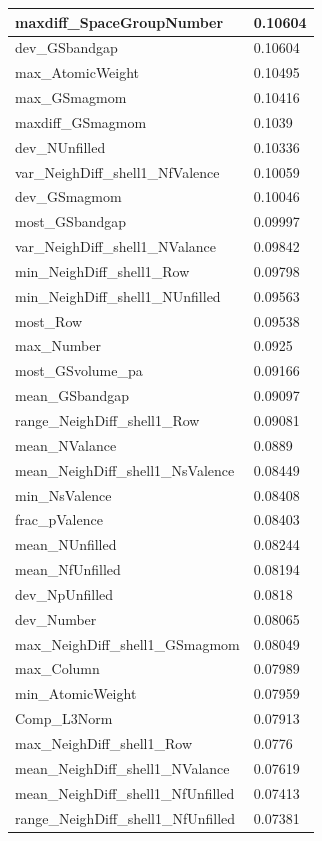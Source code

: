 \begin{longtable}{|l|l|}
maxdiff\_SpaceGroupNumber & 0.10604 \\ \hline
dev\_GSbandgap & 0.10604 \\ \hline
max\_AtomicWeight & 0.10495 \\ \hline
max\_GSmagmom & 0.10416 \\ \hline
maxdiff\_GSmagmom & 0.1039 \\ \hline
dev\_NUnfilled & 0.10336 \\ \hline
var\_NeighDiff\_shell1\_NfValence & 0.10059 \\ \hline
dev\_GSmagmom & 0.10046 \\ \hline
most\_GSbandgap & 0.09997 \\ \hline
var\_NeighDiff\_shell1\_NValance & 0.09842 \\ \hline
min\_NeighDiff\_shell1\_Row & 0.09798 \\ \hline
min\_NeighDiff\_shell1\_NUnfilled & 0.09563 \\ \hline
most\_Row & 0.09538 \\ \hline
max\_Number & 0.0925 \\ \hline
most\_GSvolume\_pa & 0.09166 \\ \hline
mean\_GSbandgap & 0.09097 \\ \hline
range\_NeighDiff\_shell1\_Row & 0.09081 \\ \hline
mean\_NValance & 0.0889 \\ \hline
mean\_NeighDiff\_shell1\_NsValence & 0.08449 \\ \hline
min\_NsValence & 0.08408 \\ \hline
frac\_pValence & 0.08403 \\ \hline
mean\_NUnfilled & 0.08244 \\ \hline
mean\_NfUnfilled & 0.08194 \\ \hline
dev\_NpUnfilled & 0.0818 \\ \hline
dev\_Number & 0.08065 \\ \hline
max\_NeighDiff\_shell1\_GSmagmom & 0.08049 \\ \hline
max\_Column & 0.07989 \\ \hline
min\_AtomicWeight & 0.07959 \\ \hline
Comp\_L3Norm & 0.07913 \\ \hline
max\_NeighDiff\_shell1\_Row & 0.0776 \\ \hline
mean\_NeighDiff\_shell1\_NValance & 0.07619 \\ \hline
mean\_NeighDiff\_shell1\_NfUnfilled & 0.07413 \\ \hline
range\_NeighDiff\_shell1\_NfUnfilled & 0.07381 \\ \hline

\end{longtable}
